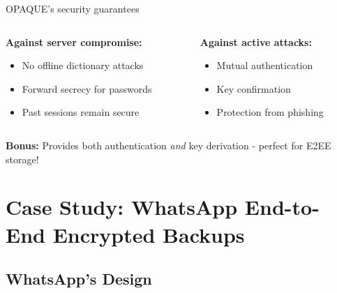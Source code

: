 \documentclass[aspectratio=169, lualatex, handout]{beamer}
\begin{document}
\begin{frame}{OPAQUE's security guarantees}
	\begin{columns}[c]
		\begin{column}{0.5\textwidth}
			\textbf{Against server compromise:}
			\begin{itemize}
				\item[\textcolor{green}{\mycheckmark}] No offline dictionary attacks
				\item[\textcolor{green}{\mycheckmark}] Forward secrecy for passwords
				\item[\textcolor{green}{\mycheckmark}] Past sessions remain secure
			\end{itemize}
		\end{column}
		\begin{column}{0.5\textwidth}
			\textbf{Against active attacks:}
			\begin{itemize}
				\item[\textcolor{green}{\mycheckmark}] Mutual authentication
				\item[\textcolor{green}{\mycheckmark}] Key confirmation
				\item[\textcolor{green}{\mycheckmark}] Protection from phishing
			\end{itemize}
		\end{column}
	\end{columns}
	\vspace{0.5cm}
	\begin{center}
		\textbf{Bonus:} Provides both authentication \textit{and} key derivation - perfect for E2EE storage!
	\end{center}
\end{frame}

\section{Case Study: WhatsApp End-to-End Encrypted Backups}

\subsection{WhatsApp's Design}
\end{document}
